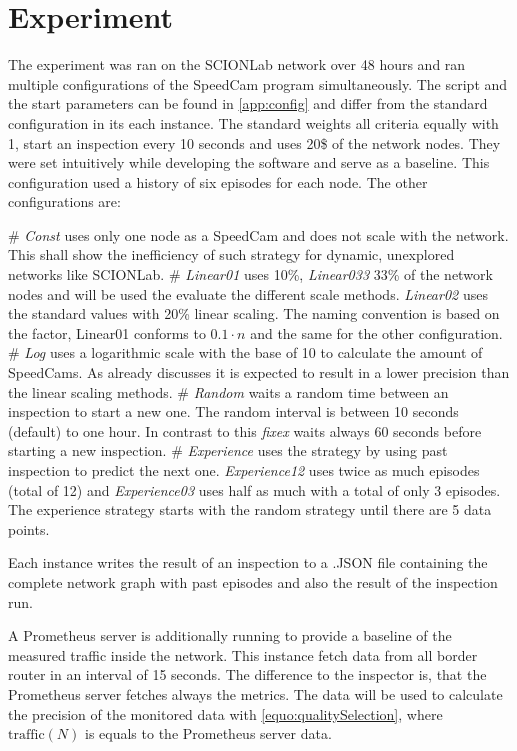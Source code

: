 \documentclass[thesis.tex]{subfiles}
\begin{document}
\section{Experiment}

The experiment was ran on the SCIONLab network over 48 hours and ran multiple configurations of the SpeedCam program simultaneously. The script and the start parameters can be found in \autoref{app:config} and differ from the standard configuration in its each instance. The standard weights all criteria equally with 1, start an inspection every 10 seconds and uses 20\$ of the network nodes. They were set intuitively while developing the software and serve as a baseline. This configuration used a history of six episodes for each node. The other configurations are:

\begin{easylist}
	# \textit{Const} uses only one node as a SpeedCam and does not scale with the network. This shall show the inefficiency of such strategy for dynamic, unexplored networks like SCIONLab.
	# \textit{Linear01} uses 10\%, \textit{Linear033} 33\% of the network nodes and will be used the evaluate the different scale methods. \textit{Linear02} uses the standard values with 20\% linear scaling. The naming convention is based on the factor, Linear01 conforms to $0.1 \cdot n$ and the same for the other configuration.
	# \textit{Log} uses a logarithmic scale with the base of 10 to calculate the amount of SpeedCams. As already discusses it is expected to result in a lower precision than the linear scaling methods.
	# \textit{Random} waits a random time between an inspection to start a new one. The random interval is between 10 seconds (default) to one hour. In contrast to this \textit{fixex} waits always 60 seconds before starting a new inspection.
	# \textit{Experience} uses the strategy by using past inspection to predict the next one. \textit{Experience12} uses twice as much episodes (total of 12) and \textit{Experience03} uses half as much with a total of only 3 episodes. The experience strategy starts with the random strategy until there are 5 data points.		
\end{easylist}

Each instance writes the result of an inspection to a .JSON file containing the complete network graph with past episodes and also the result of the inspection run. 

A Prometheus server is additionally running to provide a baseline of the measured traffic inside the network. This instance fetch data from all border router in an interval of 15 seconds. The difference to the inspector is, that the Prometheus server fetches always the metrics. The data will be used to calculate the precision of the monitored data with \autoref{equo:qualitySelection}, where $\text{traffic}(N)$ is equals to the Prometheus server data. 
\end{document}
